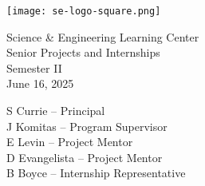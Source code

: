 \vspace*{\fill}
\begin{center}
\texttt{[image: se-logo-square.png]}
\end{center}
\vspace{1em}
\begin{center}
\large{Science \& Engineering Learning Center}\\
Senior Projects and Internships\\
Semester II\\
June 16, 2025
\end{center}
\vfill
\begin{center}
\large{
S Currie -- Principal\\
J Komitas -- Program Supervisor\\
E Levin -- Project Mentor\\
D Evangelista -- Project Mentor\\
B Boyce -- Internship Representative}
\end{center}
\vspace*{\fill}
